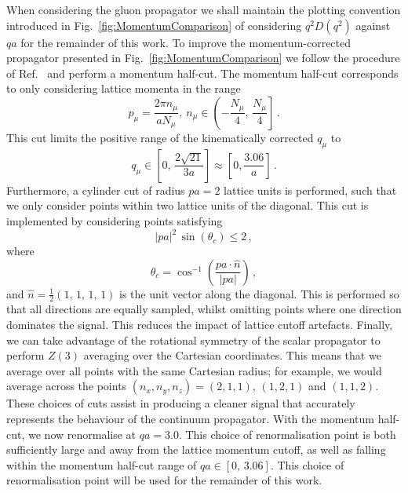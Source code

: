 When considering the gluon propagator we shall maintain the plotting convention introduced in Fig.~\ref{fig:MomentumComparison} of considering $q^2D(q^2)$ against $qa$ for the remainder of this work. To improve the momentum-corrected propagator presented in  Fig.~\ref{fig:MomentumComparison} we follow the procedure of Ref.~\cite{Bonnet:2001uh,Leinweber:1998im} and perform a momentum half-cut. The momentum half-cut corresponds to only considering lattice momenta in the range
%
\begin{equation}
p_\mu = \frac{2\pi n_\mu}{a N_\mu},~n_\mu\in \left(-\frac{N_\mu}{4},\,\frac{N_\mu}{4}\right]\, .
\end{equation}
%
This cut limits the positive range of the kinematically corrected $q_\mu$ to
%
\begin{equation}
q_\mu \in \left[0,\, \frac{2\sqrt{21}}{3a}\right]\approx\left[0,\frac{3.06}{a} \right]\, .
\end{equation}
%
Furthermore, a cylinder cut of radius $pa=2$ lattice units is performed, such that we only consider points within two lattice units of the diagonal. This cut is implemented by considering points satisfying
%
\begin{equation}
|pa|^2\, \sin(\theta_c) \leq 2\, ,
\end{equation}
%
where
%
\begin{equation}
\theta_c = \cos^{-1}\left(\frac{pa \cdot \hat{n}}{|pa|}\right)\, ,
\end{equation}
%
and $\hat{n} = \frac{1}{2}(1,\,1,\,1,\,1)$ is the unit vector along the diagonal. This is performed so that all directions are equally sampled, whilst omitting points where one direction dominates the signal. This reduces the impact of lattice cutoff artefacts. Finally, we can take advantage of the rotational symmetry of the scalar propagator to perform $Z(3)$ averaging over the Cartesian coordinates. This means that we average over all points with the same Cartesian radius; for example, we would average across the points $(n_x,n_y,n_z)=(2,1,1),\,(1,2,1)$ and $(1,1,2)$. These choices of cuts assist in producing a cleaner signal that accurately represents the behaviour of the continuum propagator. With the momentum half-cut, we now renormalise at $qa=3.0$. This choice of renormalisation point is both sufficiently large and away from the lattice momentum cutoff, as well as falling within the momentum half-cut range of $qa\in [0,\,3.06]$. This choice of renormalisation point will be used for the remainder of this work.\\

